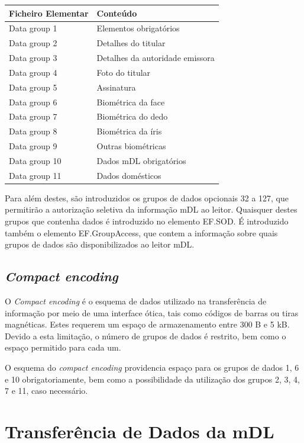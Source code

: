 \documentclass[11pt]{article}
\begin{document}
\begin{itemize}
\begin{itemize}
\begin{table}[H]
\begin{tabular}{|l|l|}
\hline
Ficheiro Elementar & Conteúdo \\ \hline
Data group 1 & Elementos obrigatórios \\ \hline
Data group 2 & Detalhes do titular \\ \hline
Data group 3 & Detalhes da autoridade emissora \\ \hline
Data group 4 & Foto do titular \\ \hline
Data group 5 & Assinatura \\ \hline
Data group 6 & Biométrica da face \\ \hline
Data group 7 & Biométrica do dedo \\ \hline
Data group 8 & Biométrica da íris \\ \hline
Data group 9 & Outras biométricas \\ \hline
Data group 10 & Dados mDL obrigatórios \\ \hline
Data group 11 & Dados domésticos \\ \hline
\end{tabular}
\end{table}

Para além destes, são introduzidos os grupos de dados opcionais 32 a 127, que permitirão a autorização seletiva da informação mDL ao leitor. Quaisquer destes grupos que contenha dados é introduzido no elemento EF.SOD. É introduzido também o elemento EF.GroupAccess, que contem a informação sobre quais grupos de dados são disponibilizados ao leitor mDL.

\subsection{\textit{Compact encoding}}

O \textit{Compact encoding} é o esquema de dados utilizado na transferência de informação por meio de uma interface ótica, tais como códigos de barras ou tiras magnéticas. Estes requerem um espaço de armazenamento entre 300 B e 5 kB. Devido a esta limitação, o número de grupos de dados é restrito, bem como o espaço permitido para cada um.

O esquema do \textit{compact encoding} providencia espaço para os grupos de dados 1, 6 e 10 obrigatoriamente, bem como a possibilidade da utilização dos grupos 2, 3, 4, 7 e 11, caso necessário.

\section{Transferência de Dados da mDL}



\end{itemize}
\end{itemize}
\end{document}

